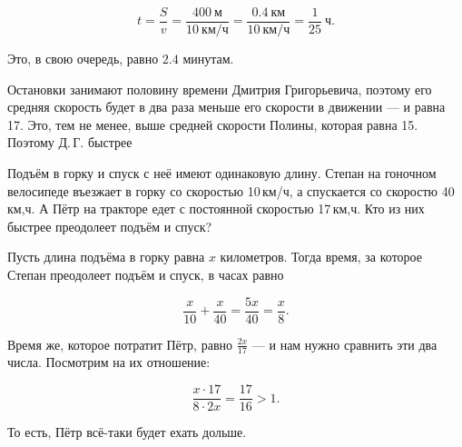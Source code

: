 \begin{itemize}

\itA $$t = \frac{S}{v} = \frac{\SI{400}{\text{м}}}{\SI{10}{\text{км/ч}}}
	= \frac{\SI{0.4}{\text{км}}}{\SI{10}{\text{км/ч}}}
	= \frac{1}{25}\ \text{ч}.$$

Это, в свою очередь, равно $2.4$ минутам.

\itB Остановки занимают половину времени Дмитрия Григорьевича, поэтому его средняя скорость будет в два раза меньше его скорости в движении — и равна \SI{17}{}. Это, тем не менее, выше средней скорости Полины, которая равна \SI{15}{}. Поэтому Д.\,Г. быстрее

\itC Подъём в горку и спуск с неё имеют одинаковую длину. Степан на гоночном велосипеде въезжает в горку со скоростью 10\,км/ч, а спускается со скоростю 40\,км,ч. А Пётр на тракторе едет с постоянной скоростью 17\,км,ч. Кто из них быстрее преодолеет подъём и спуск?

Пусть длина подъёма в горку равна $x$ километров. Тогда время, за которое Степан преодолеет подъём и спуск, в часах равно

$$\frac{x}{10} + \frac{x}{40} = \frac{5x}{40} = \frac{x}{8}.$$

Время же, которое потратит Пётр, равно $\frac{2x}{17}$ — и нам нужно сравнить эти два числа. Посмотрим на их отношение:

$$\frac{x \cdot 17}{8 \cdot 2x} = \frac{17}{16} > 1.$$

То есть, Пётр всё-таки будет ехать дольше.

\end{itemize}